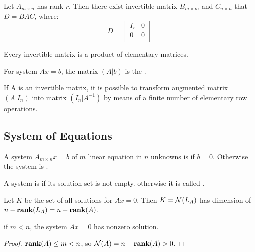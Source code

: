 \begin{theorem}
    Let $A_{m \times n}$ has rank $r$. Then there exist invertible matrix $B_{m \times m}$ and $C_{n \times n}$ that $D=BAC$, where:
    \begin{equation*}
        D = \begin{bmatrix}
			I_r & 0 \\
			0 & 0 \\
		\end{bmatrix}
    \end{equation*}
\end{theorem}


\begin{theorem}
    Every invertible matrix is a product of elementary matrices.
\end{theorem}

\begin{definition}
	For system $Ax=b$, the matrix $(A|b)$ is the .
\end{definition}


\begin{theorem}
    If A is an invertible matrix, it is possible to transform augmented matrix $(A|I_n)$ into matrix $(I_n|A^{-1})$ by means of a finite number of elementary row operations.
\end{theorem}

\subsection{System of Equations}

\begin{definition}
	A system $A_{m \times n} x=b$ of $m$ linear equation in $n$ unknowns is  if $b=0$. Otherwise the system is .
\end{definition}

\begin{definition}
	A system is  if its solution set is not empty. otherwise it is called .
\end{definition}

\begin{theorem}
	Let $K$ be the set of all solutions for $Ax=0$. Then $K=\mathcal{N}(L_A)$ has dimension of $n- \displaystyle \mathbf{rank}( L_A )=n-\displaystyle \mathbf{rank}( A )$.
\end{theorem}

\begin{theorem}
	if $m < n$, the system $Ax=0$ has nonzero solution.
\end{theorem}
\begin{proof}
    $\displaystyle \mathbf{rank}( A ) \leq m < n$, so $\mathcal{N}(A) = n - \displaystyle \mathbf{rank}( A ) > 0$.
\end{proof}

